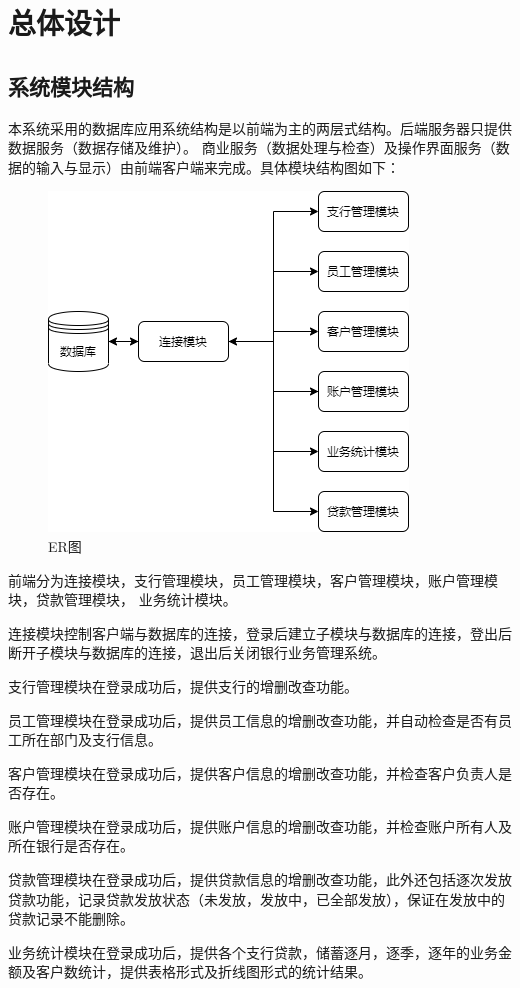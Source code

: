 \documentclass{ctexart}
\begin{document}
\section{\hei 总体设计}
\subsection{\hei 系统模块结构}
本系统采用的数据库应用系统结构是以前端为主的两层式结构。后端服务器只提供数据服务（数据存储及维护）。
商业服务（数据处理与检查）及操作界面服务（数据的输入与显示）由前端客户端来完成。具体模块结构图如下：
\begin{figure}[H]
    \centering
    \includegraphics[scale=0.7]{Untitled D123iagram.png}
    \caption{ER图}
\end{figure}
\par 前端分为连接模块，支行管理模块，员工管理模块，客户管理模块，账户管理模块，贷款管理模块，
业务统计模块。
\par 连接模块控制客户端与数据库的连接，登录后建立子模块与数据库的连接，登出后断开子模块与数据库的连接，退出后关闭银行业务管理系统。
\par 支行管理模块在登录成功后，提供支行的增删改查功能。
\par 员工管理模块在登录成功后，提供员工信息的增删改查功能，并自动检查是否有员工所在部门及支行信息。
\par 客户管理模块在登录成功后，提供客户信息的增删改查功能，并检查客户负责人是否存在。
\par 账户管理模块在登录成功后，提供账户信息的增删改查功能，并检查账户所有人及所在银行是否存在。
\par 贷款管理模块在登录成功后，提供贷款信息的增删改查功能，此外还包括逐次发放贷款功能，记录贷款发放状态（未发放，发放中，已全部发放），保证在发放中的贷款记录不能删除。
\par 业务统计模块在登录成功后，提供各个支行贷款，储蓄逐月，逐季，逐年的业务金额及客户数统计，提供表格形式及折线图形式的统计结果。
\end{document}
